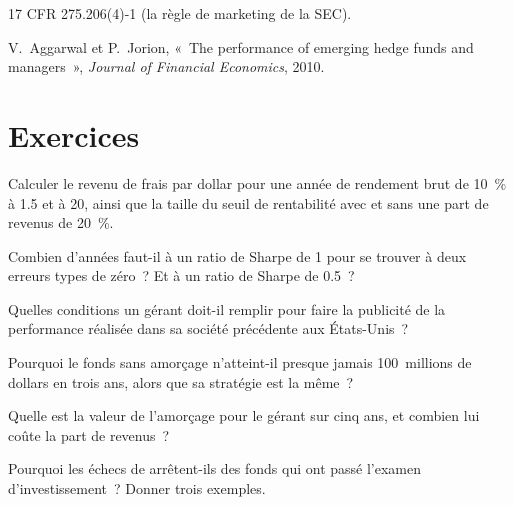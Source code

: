 \begin{omsources}
\item 17 CFR 275.206(4)-1 (la règle de marketing de la SEC).
\item V.~Aggarwal et P.~Jorion, «~The performance of emerging hedge funds and managers~», \emph{Journal of Financial Economics}, 2010.
\end{omsources}

\section{Exercices}

\begin{exercise}[$\star$]\label{exo:fm:launching-a-fund-and-raising-capital:1}
Calculer le revenu de frais par dollar pour une année de rendement brut de 10~\% à 1.5 et à 20, ainsi que la taille du seuil de rentabilité avec et sans une part de revenus de 20~\%.
\end{exercise}

\begin{exercise}[$\star$]\label{exo:fm:launching-a-fund-and-raising-capital:2}
Combien d'années faut-il à un ratio de Sharpe de 1 pour se trouver à deux erreurs types de zéro~? Et à un ratio de Sharpe de 0.5~?
\end{exercise}

\begin{exercise}[$\star$]\label{exo:fm:launching-a-fund-and-raising-capital:3}
Quelles conditions un gérant doit-il remplir pour faire la publicité de la performance réalisée dans sa société précédente aux États-Unis~?
\end{exercise}

\begin{exercise}[$\star\star$]\label{exo:fm:launching-a-fund-and-raising-capital:4}
Pourquoi le fonds sans amorçage n'atteint-il presque jamais 100~millions de dollars en trois ans, alors que sa stratégie est la même~?
\end{exercise}

\begin{exercise}[$\star\star$]\label{exo:fm:launching-a-fund-and-raising-capital:5}
Quelle est la valeur de l'amorçage pour le gérant sur cinq ans, et combien lui coûte la part de revenus~?
\end{exercise}

\begin{exercise}[$\star\star$]\label{exo:fm:launching-a-fund-and-raising-capital:6}
Pourquoi les échecs de  arrêtent-ils des fonds qui ont passé l'examen d'investissement~? Donner trois exemples.
\end{exercise}

